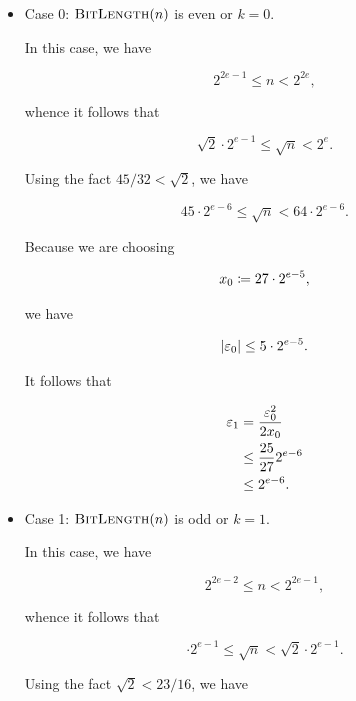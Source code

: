 \begin{itemize}
\item Case 0: $\textsc{BitLength}(n)$ is even or $k=0$.

In this case, we have

\begin{equation}
    2^{2e-1} \le n < 2^{2e},
\end{equation}

\noindent
whence it follows that

\begin{equation}
    \sqrt{2}\cdot2^{e-1} \le \sqrt{n} < 2^{e}.
\end{equation}

\noindent
Using the fact $45/32 < \sqrt{2}$, we have

\begin{equation}
    45\cdot2^{e-6} \le \sqrt{n} < 64\cdot2^{e-6}.
\end{equation}

\noindent
Because we are choosing

\begin{equation}
    x_{0} \coloneqq{} 27\cdot2^{e-5},
\end{equation}

\noindent
we have

\begin{equation}
    \left| \varepsilon_{0} \right| \le 5\cdot2^{e-5}.
\end{equation}

It follows that

\begin{align}
    \varepsilon_{1} &= \frac{\varepsilon_{0}^{2}}{2x_{0}} \nonumber\\
        &\le \frac{25}{27}2^{e-6} \nonumber\\
        &\le 2^{e-6}.
\end{align}

\item Case 1: $\textsc{BitLength}(n)$ is odd or $k=1$.

In this case, we have

\begin{equation}
    2^{2e-2} \le n < 2^{2e-1},
\end{equation}

\noindent
whence it follows that

\begin{equation}
    \cdot2^{e-1} \le \sqrt{n} < \sqrt{2}\cdot2^{e-1}.
\end{equation}

\noindent
Using the fact $\sqrt{2} < 23/16$, we have


\end{itemize}
